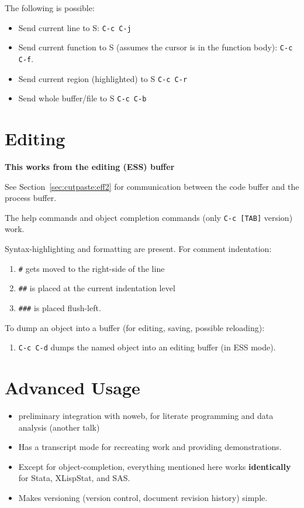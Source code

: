 \documentclass{article}
\begin{document}
The following is possible:
\begin{itemize}
\item Send current line to S: \verb+C-c C-j+
\item Send current function to S (assumes the cursor is in the
  function body): \verb+C-c C-f+.
\item Send current region (highlighted) to S  \verb+C-c C-r+
\item Send whole buffer/file to S  \verb+C-c C-b+
\end{itemize}


\section{Editing}
\label{sec:edit}

\textbf{This works from the editing (ESS) buffer}

See Section~\ref{sec:cutpaste:eff2} for communication between the code
buffer and the process buffer.

The help commands and object completion commands (only \verb+C-c [TAB]+
version) work.

Syntax-highlighting and formatting are present.  For comment indentation:
\begin{enumerate}
\item \verb+#+ gets moved to the right-side of the line
\item \verb+##+ is placed at the current indentation level
\item \verb+###+ is placed flush-left.
\end{enumerate}

To dump an object into a buffer (for editing, saving, possible reloading):
\begin{enumerate}
\item \verb+C-c C-d+ dumps the named object into an editing buffer (in
  ESS mode).
\end{enumerate}


\section{Advanced Usage}
\label{sec:advanced}

\begin{itemize}
\item preliminary integration with noweb, for literate programming and
  data analysis (another talk)
\item Has a transcript mode for recreating work and providing
  demonstrations.
\item Except for object-completion, everything mentioned here works
  \textbf{identically} for Stata, XLispStat, and SAS.
\item Makes versioning (version control, document revision history)
  simple.
\end{itemize}
\end{document}
